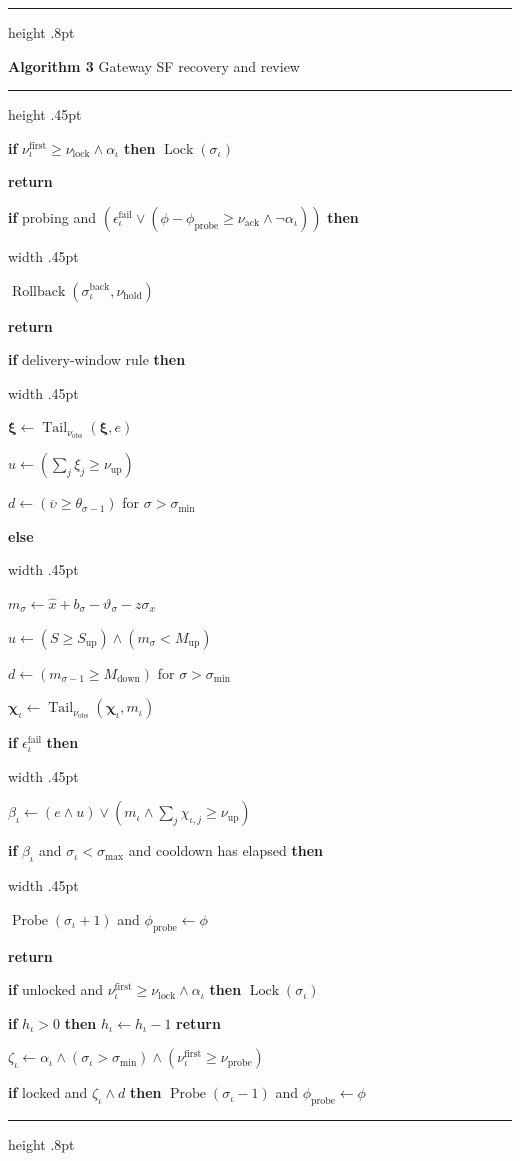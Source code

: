 \documentclass[11pt,multi=algorithm,border=6pt]{standalone}
\newenvironment{algorithm}[2]{%
  \begin{minipage}{252pt}
  \raggedright
  \setlength{\parindent}{0pt}%
  \setlength{\parskip}{2pt}%
  \hrule height .8pt\vspace{4pt}%
  {\large\textbf{Algorithm #1} \enspace #2\par}%
  \vspace{3pt}\hrule height .45pt\vspace{5pt}%
}{\par\vspace{5pt}\hrule height .8pt\end{minipage}}
\newcommand{\Step}[1]{\noindent #1\par}
\DeclareMathOperator{\Lock}{Lock}
\DeclareMathOperator{\Rollback}{Rollback}
\DeclareMathOperator{\Probe}{Probe}
\DeclareMathOperator{\Tail}{Tail}
\newcommand{\Block}[2]{%
  \Step{#1}%
  \noindent\hspace{.75em}\vrule width .45pt\hspace{.65em}%
  \begin{minipage}[t]{\dimexpr\linewidth-1.4em-.45pt\relax}%
    \raggedright\setlength{\parskip}{2pt}#2%
  \end{minipage}\par%
}
\begin{document}
\begin{algorithm}{3}{Gateway SF recovery and review}
{    \Step{\textbf{if} $\nu^{\mathrm{first}}_\iota\ge\nu_{\mathrm{lock}}\land\alpha_\iota$
      \textbf{then} $\Lock(\sigma_\iota)$}
    \Step{\textbf{return}}%
  }
  \Block{\textbf{if} probing and $(\epsilon_\iota^{\mathrm{fail}}
      \lor (\phi-\phi_{\mathrm{probe}}\ge\nu_{\mathrm{ack}}\land\neg\alpha_\iota))$ \textbf{then}}{%
    \Step{$\Rollback(\sigma^{\mathrm{back}}_\iota,\nu_{\mathrm{hold}})$}
    \Step{\textbf{return}}%
  }
  \Block{\textbf{if} delivery-window rule \textbf{then}}{%
    \Step{$\boldsymbol{\xi}\gets\Tail_{\nu_{\mathrm{obs}}}(\boldsymbol{\xi},e)$}
    \Step{$u\gets\left(\sum_j\xi_j\ge\nu_{\mathrm{up}}\right)$}
    \Step{$d\gets(\overline{\upsilon}\ge\theta_{\sigma-1})$ for $\sigma>\sigma_{\min}$}
  }
  \Block{\textbf{else}}{%
    \Step{$m_\sigma\gets\widehat{x}+b_\sigma-\vartheta_\sigma-z\sigma_x$}
    \Step{$u\gets(S\ge S_{\mathrm{up}})\land(m_\sigma<M_{\mathrm{up}})$}
    \Step{$d\gets(m_{\sigma-1}\ge M_{\mathrm{down}})$ for $\sigma>\sigma_{\min}$}
  }
  \Step{$\boldsymbol{\chi}_\iota\gets\Tail_{\nu_{\mathrm{obs}}}(\boldsymbol{\chi}_\iota,m_\iota)$}
  \Block{\textbf{if} $\epsilon_\iota^{\mathrm{fail}}$ \textbf{then}}{%
    \Step{$\beta_\iota\gets(e\land u)\lor
      \left(m_\iota\land\sum_j\chi_{\iota,j}\ge\nu_{\mathrm{up}}\right)$}
    \Block{\textbf{if} $\beta_\iota$ and $\sigma_\iota<\sigma_{\max}$ and cooldown has elapsed
      \textbf{then}}{%
      \Step{$\Probe(\sigma_\iota+1)$ and $\phi_{\mathrm{probe}}\gets\phi$}%
    }%
    \Step{\textbf{return}}%
  }
  \Step{\textbf{if} unlocked and $\nu^{\mathrm{first}}_\iota\ge\nu_{\mathrm{lock}}\land\alpha_\iota$
    \textbf{then} $\Lock(\sigma_\iota)$}
  \Step{\textbf{if} $h_\iota>0$ \textbf{then} $h_\iota\gets h_\iota-1$ \enspace\textbf{return}}
  \Step{$\zeta_\iota\gets\alpha_\iota\land(\sigma_\iota>\sigma_{\min})
    \land(\nu^{\mathrm{first}}_\iota\ge\nu_{\mathrm{probe}})$}
  \Step{\textbf{if} locked and $\zeta_\iota\land d$ \textbf{then}
    $\Probe(\sigma_\iota-1)$ and $\phi_{\mathrm{probe}}\gets\phi$}
\end{algorithm}
\end{document}

